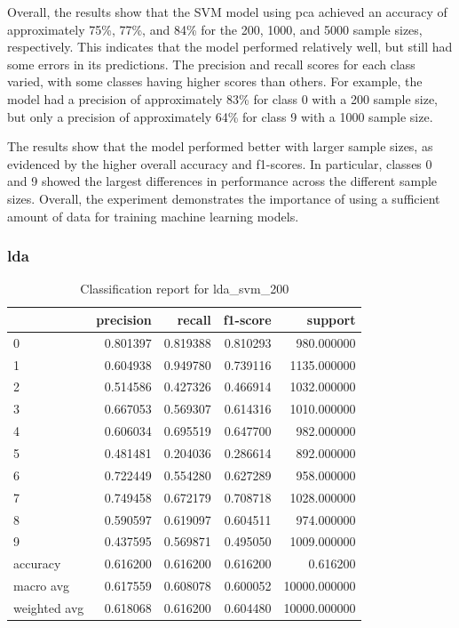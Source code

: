 Overall, the results show that the SVM model using \gls{pca} achieved an accuracy of approximately 75\%, 77\%, and 84\% for the 200, 1000, and 5000 sample sizes, respectively. This indicates that the model performed relatively well, but still had some errors in its predictions. The precision and recall scores for each class varied, with some classes having higher scores than others. For example, the model had a precision of approximately 83\% for class 0 with a 200 sample size, but only a precision of approximately 64\% for class 9 with a 1000 sample size.

The results show that the model performed better with larger sample sizes, as evidenced by the higher overall accuracy and f1-scores. In particular, classes 0 and 9 showed the largest differences in performance across the different sample sizes. Overall, the experiment demonstrates the importance of using a sufficient amount of data for training machine learning models.

\subsubsection{\gls{lda}}\label{subsubsec:experiment_4_lda}

\begin{table}[htb!]
    \centering
    \caption{Classification report for lda_svm_200}
    \label{tab:classification-report-lda_svm_200}
    \begin{tabular}{lrrrr}
    \toprule
    & precision & recall & f1-score & support \\
    \midrule
    0 & 0.801397 & 0.819388 & 0.810293 & 980.000000 \\
    1 & 0.604938 & 0.949780 & 0.739116 & 1135.000000 \\
    2 & 0.514586 & 0.427326 & 0.466914 & 1032.000000 \\
    3 & 0.667053 & 0.569307 & 0.614316 & 1010.000000 \\
    4 & 0.606034 & 0.695519 & 0.647700 & 982.000000 \\
    5 & 0.481481 & 0.204036 & 0.286614 & 892.000000 \\
    6 & 0.722449 & 0.554280 & 0.627289 & 958.000000 \\
    7 & 0.749458 & 0.672179 & 0.708718 & 1028.000000 \\
    8 & 0.590597 & 0.619097 & 0.604511 & 974.000000 \\
    9 & 0.437595 & 0.569871 & 0.495050 & 1009.000000 \\
    accuracy & 0.616200 & 0.616200 & 0.616200 & 0.616200 \\
    macro avg & 0.617559 & 0.608078 & 0.600052 & 10000.000000 \\
    weighted avg & 0.618068 & 0.616200 & 0.604480 & 10000.000000 \\
    \bottomrule
    \end{tabular}
    \end{table}

